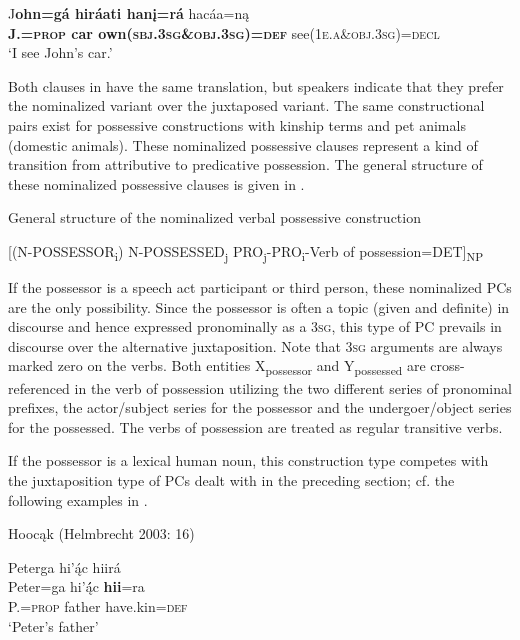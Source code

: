 \documentclass[output=paper]{LSP/langsci}
\begin{document}
\ex 
\gll J\textbf{ohn=g\'a hir\'aati han\k{i}=r\'a} hac\'aa=n\k{a}  \\
\textbf{J.=\textsc{prop} car own(\textsc{sbj.3sg}\&\textsc{obj.3sg})=\textsc{def}} see(\textsc{1e.a}\&\textsc{obj.3sg})=\textsc{decl}  \\
\glt `I see John's car.'
\z
\z 

Both clauses in  have the same translation, but speakers indicate that they prefer the nominalized variant over the juxtaposed variant. The same constructional pairs exist for possessive constructions with kinship terms and pet animals (domestic animals). These nominalized possessive clauses represent a kind of transition from attributive to predicative possession. The general structure of these nominalized possessive clauses is given in .

\ea General structure of the nominalized verbal possessive construction \label{generalstructure}

[(N-POSSESSOR\textsubscript{i})  N-POSSESSED\textsubscript{j}    PRO\textsubscript{j}-PRO\textsubscript{i}-Verb of possession=DET]\textsubscript{NP}
\z

If the possessor is a speech act participant or third person, these nominalized PCs are the only possibility. Since the possessor is often a topic (given and definite) in discourse and hence expressed pronominally as a \textsc{3sg}, this type of PC prevails in discourse over the alternative juxtaposition. Note that \textsc{3sg} arguments are always marked zero on the verbs. Both entities X\textsubscript{possessor} and Y\textsubscript{possessed} are cross-referenced in the verb of possession utilizing the two different series of pronominal prefixes, the actor/subject series for the possessor and the undergoer/object series for the possessed. The verbs of possession are treated as regular transitive verbs.

If the possessor is a lexical human noun, this construction type competes with the juxtaposition type of PCs dealt with in the preceding section; cf. the following examples in .
 
\ea Hoocąk (Helmbrecht 2003: 16) \label{petersthings}

\ea 
\glll Peterga hi'ą́c hiirá \\
Peter=ga        hi’ą́́c   \textbf{hii}=ra \\
P.=\textsc{prop}  father have.kin=\textsc{def} \\
\glt `Peter's father'
\end{document}
